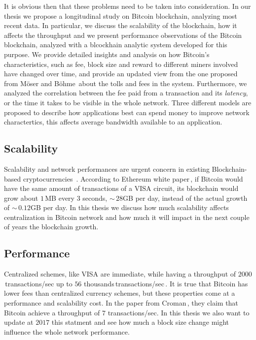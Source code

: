 \documentclass[USenglish]{uit-thesis}
\begin{document}
It is obvious then that these problems need to be taken
into consideration.
In our thesis we propose a longitudinal study on Bitcoin blockchain,
analyzing most recent data.
In particular, we discuss the scalability of the blockchain, how it affects
the throughput and we present performance observations of the
Bitcoin blockchain, analyzed with a blcockhain analytic system developed
for this purpose. We provide detailed insights and analysis on how
Bitcoin's characteristics, such as fee, block size and reward to different
miners involved have changed over time, and provide an
updated view from the one proposed
from Möser and Böhme\,\cite{Moser2015} about
the tolls and fees in the system.
Furthermore, we analyzed the
correlation between the fee paid from a transaction
and its \emph{latency}, or the time it takes to 
be visible in the whole network.
Three different models are proposed to describe how applications
best can spend money to improve network charactertics,
this affects average bandwidth available to an application. 

\subsection{Scalability}
\label{sec:prob_stat_scalability}
Scalability and network performances are urgent
concern in existing Blockchain-based
cryptocurrencies~\cite{croman2016}.
According to Ethereum white paper\,\cite{ethereum_white_paper},
if Bitcoin would have the same amount of transactions
of a VISA circuit, its blockchain would grow
about $1$\,MB every $3$ seconds, $\sim$\,$28$GB per day,
instead of the actual growth of $\sim$\,$0.12$GB per day.
In this thesis we discuss how much scalability affects
centralization in Bitcoin network and how much it will
impact in the next couple of years the blockchain
growth.

\subsection{Performance}
Centralized schemes, like VISA are immediate, while having a
throughput of $2000$\,transactions/sec
up to $56$ thousands\,transactions/sec\,\cite{croman2016}.
It is true that Bitcoin has lower fees than centralized
currency schemes, but these properties
come at a performance and scalability cost.
In the paper from Croman\,\cite{croman2016}, they
claim that Bitcoin achieve a throughput of $7$ transactions/sec.
In this thesis we also want to update at $2017$ this statment
and see how much a block size change might
influence the whole network performance.
\end{document}
